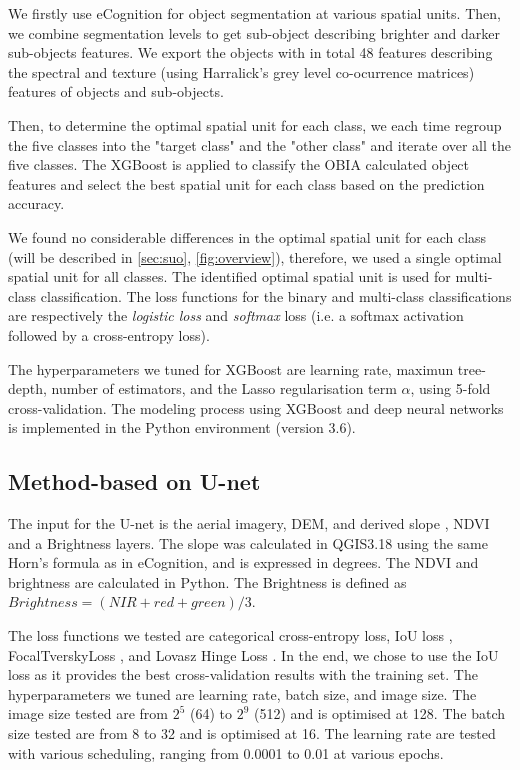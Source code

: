 \documentclass{isprs} %
\begin{document}
We firstly use eCognition for object segmentation at various spatial units. Then, we combine segmentation levels to get sub-object describing brighter and darker sub-objects features. We export the objects with in total 48 features describing the spectral and texture (using Harralick's grey level co-ocurrence matrices) features of objects and sub-objects.

Then, to determine the optimal spatial unit for each class, we each time regroup the five classes into the "target class" and the "other class" and iterate over all the five classes. The XGBoost is applied to classify the OBIA calculated object features and select the best spatial unit for each class based on the prediction accuracy. 

We found no considerable differences in the optimal spatial unit for each class (will be described in \cref{sec:suo}, \cref{fig:overview}), therefore, we used a single optimal spatial unit for all classes. The identified optimal spatial unit is used for multi-class classification. The loss functions for the binary and multi-class classifications are respectively the \textit{logistic loss} and \textit{softmax} loss (i.e. a softmax activation followed by a cross-entropy loss). 

The hyperparameters we tuned for XGBoost are learning rate, maximun tree-depth, number of estimators, and the Lasso regularisation term $\alpha$, using 5-fold cross-validation. The modeling process using XGBoost and deep neural networks is implemented in the Python environment (version 3.6). 

\subsection{Method-based on U-net}

The input for the U-net is the aerial imagery, DEM, and derived slope \citep{horn1981hill}, NDVI and a Brightness layers. The slope was calculated in QGIS3.18 using the same Horn's formula \citep{horn1981hill} as in eCognition, and is expressed in degrees. The NDVI and brightness are calculated in Python. The Brightness is defined as $Brightness =  (NIR+red+green)/3$.
 
The loss functions we tested are categorical cross-entropy loss, IoU loss \citep{van2019deep}, FocalTverskyLoss \citep{abraham2019novel}, and Lovasz Hinge Loss \citep{berman2018lovasz}. In the end, we chose to use the IoU loss as it provides the best cross-validation results with the training set. The hyperparameters we tuned are learning rate, batch size, and image size. The image size tested are from $2^5$ (64) to $2^9$ (512) and is optimised at 128. The batch size tested are from 8 to 32 and is optimised at 16. The learning rate are tested with various scheduling, ranging from 0.0001 to 0.01 at various epochs. 
 
\end{document}
